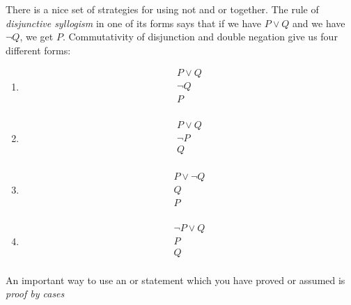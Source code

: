 \documentclass[12pt]{article}
\begin{document}
There is a nice set of strategies for using not and or together.  The rule of {\em disjunctive syllogism\/} in one of its forms says that if we have $P \vee Q$ and we have $\neg Q$, we get $P$.  Commutativity of disjunction and double negation give us four different forms:

\begin{enumerate}
\item

$$\begin{array}{c}

P\vee Q \\

\neg Q \\ \hline

P \\
\end{array}$$

\item

$$\begin{array}{c}

P\vee Q \\

\neg P \\ \hline

Q \\
\end{array}$$

\item

$$\begin{array}{c}

P\vee \neg Q \\

Q \\ \hline

P \\
\end{array}$$

\item

$$\begin{array}{c}

\neg P\vee Q \\

P \\ \hline

Q \\
\end{array}$$

\end{enumerate}

\newpage

An important way to use an or statement which you have proved or assumed is {\em proof by cases\/}
\end{document}
